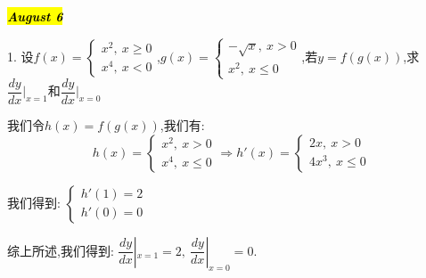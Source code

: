 \hl{\textbf{\textit{August 6}}}

1. 设$f(x)=\left\lbrace
\begin{array}{l}
	x^2,\ x\geq 0\\
	x^4,\ x<0
\end{array}
\right. $,$g(x)=\left\lbrace
\begin{array}{l}
	-\sqrt{x},\ x>0\\
	x^2,\ x\leq 0
\end{array}
\right. $,若$y=f(g(x))$,求$\dfrac{dy}{dx}|_{x=1}$和$\dfrac{dy}{dx}|_{x=0}$
\begin{solution}

	我们令$h(x)=f(g(x))$,我们有:  
	$$h(x)=\left\lbrace
	\begin{array}{l}
		x^2,\ x>0\\
		x^4,\ x\leq 0
	\end{array}
	\right. \Rightarrow h'(x)=\left\lbrace
	\begin{array}{l}
		2x,\ x>0\\
		4x^3,\ x\leq 0
	\end{array}
	\right. $$
	
	我们得到:  $\left\lbrace
	\begin{array}{l}
		h'(1)=2\\
		h'(0)=0
	\end{array}
	\right. $
	
	综上所述,我们得到:  $\dfrac{dy}{dx}|_{x=1}=2,\ \dfrac{dy}{dx}|_{x=0}=0$.
\end{solution}

